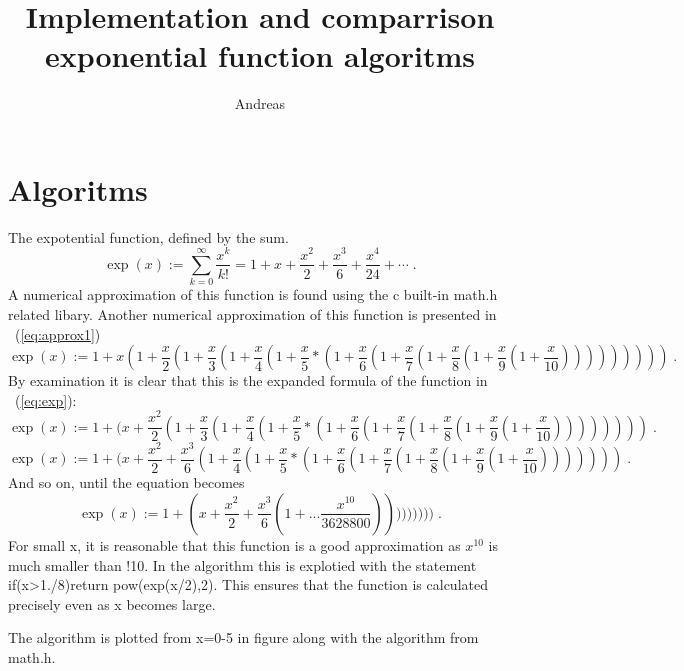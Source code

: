 \documentclass{article}
\title{Implementation and comparrison exponential function algoritms}
\author{Andreas}
\date{}
\begin{document}
\maketitle

\section{Algoritms}
The expotential function, defined by the sum. ~\cite{expref}
	\begin{equation}\label{eq:exp}
\exp (x) := \sum_{k = 0}^{\infty} \frac{x^k}{k!} = 1 + x + \frac{x^2}{2} + \frac{x^3}{6} + \frac{x^4}{24} + \cdots\;.
	\end{equation}
A numerical approximation of this function is found using the c built-in math.h related libary.
Another numerical approximation of this function is presented in ~(\ref{eq:approx1}) 
	\begin{equation}\label{eq:approx1}
\exp (x) := 1 + x(1+\frac{x}{2}(1+\frac{x}{3}(1+\frac{x}{4}(1+\frac{x}{5}*(1+\frac{x}{6}(1+\frac{x}{7}(1+\frac{x}{8}(1+\frac{x}{9}(1+\frac{x}{10})))))))))\;.
	\end{equation}
By examination it is clear that this is the expanded formula of the function in ~(\ref{eq:exp}):
	\begin{equation}\label{eq:deri1}
\exp (x) := 1 + (x+\frac{x^2}{2}(1+\frac{x}{3}(1+\frac{x}{4}(1+\frac{x}{5}*(1+\frac{x}{6}(1+\frac{x}{7}(1+\frac{x}{8}(1+\frac{x}{9}(1+\frac{x}{10}))))))))\;.
	\end{equation}
	\begin{equation}\label{eq:deri2}
\exp (x) := 1 + (x+\frac{x^2}{2}+\frac{x^3}{6}(1+\frac{x}{4}(1+\frac{x}{5}*(1+\frac{x}{6}(1+\frac{x}{7}(1+\frac{x}{8}(1+\frac{x}{9}(1+\frac{x}{10})))))))\;.
	\end{equation}
And so on, until the equation becomes 
	\begin{equation}\label{eq:deri2}
\exp (x) := 1 + (x+\frac{x^2}{2}+\frac{x^3}{6}(1+...\frac{x^{10}}{3628800})))))))))\;.
	\end{equation}
For small x, it is reasonable that this function is a good approximation as $x^{10}$ is much smaller than !10.
In the algorithm this is explotied with the statement if(x>1./8)return pow(exp(x/2),2). This ensures that the function
is calculated precisely even as x becomes large.

The algorithm is plotted from x=0-5 in figure along with the algorithm from math.h. 
\end{document}
